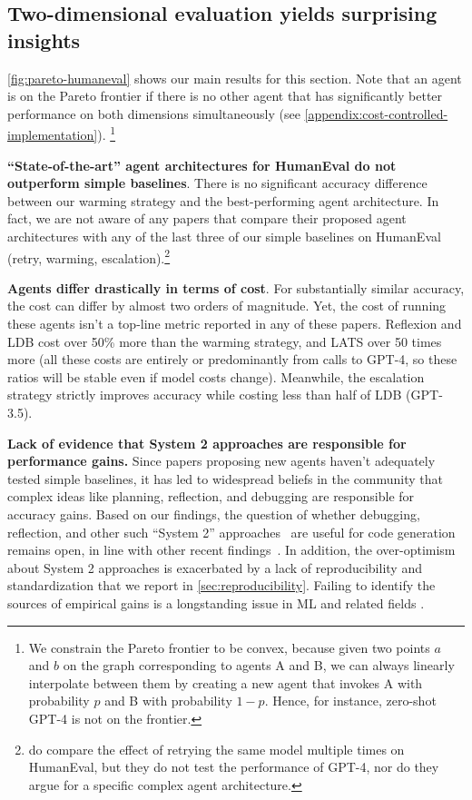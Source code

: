 \documentclass{article}
\begin{document}
\subsection{Two-dimensional evaluation yields surprising insights}

\cref{fig:pareto-humaneval} shows our main results for this section. Note that an agent is on the Pareto frontier if there is no other agent that has significantly better performance on both dimensions simultaneously (see \cref{appendix:cost-controlled-implementation}). 
\footnote{We constrain the Pareto frontier to be convex, because given two points $a$ and $b$ on the graph corresponding to agents A and B, we can always linearly interpolate between them by creating a new agent that invokes A with probability $p$ and B with probability $1-p$. Hence, for instance, zero-shot GPT-4 is not on the frontier.}


\textbf{``State-of-the-art'' agent architectures for HumanEval do not outperform simple baselines}. There is no significant accuracy difference between our warming strategy and the best-performing agent architecture. In fact, we are not aware of any papers that compare their proposed agent architectures with any of the last three of our simple baselines on HumanEval (retry, warming, escalation).\footnote{\citet{chen_are_2024} do compare the effect of retrying the same model multiple times on HumanEval, but they do not test the performance of GPT-4, nor do they argue for a specific complex agent architecture.}

\textbf{Agents differ drastically in terms of cost}. For substantially similar accuracy, the cost can differ by almost two orders of magnitude. Yet, the cost of running these agents isn't a top-line metric reported in any of these papers. Reflexion and LDB cost over 50\% more than the warming strategy, and LATS over 50 times more (all these costs are entirely or predominantly from calls to GPT-4, so these ratios will be stable even if model costs change). Meanwhile, the escalation strategy strictly improves accuracy while costing less than half of LDB (GPT-3.5).

\textbf{Lack of evidence that System 2 approaches are responsible for performance gains.} Since papers proposing new agents haven't adequately tested simple baselines, it has led to widespread beliefs in the community that complex ideas like planning, reflection, and debugging are responsible for accuracy gains. Based on our findings, the question of whether debugging, reflection, and other such ``System 2'' approaches~\citep{kambhampati_llms_2024} are useful for code generation remains open, in line with other recent findings~\citep{verma_brittle_2024, huang_large_2023}. In addition, the over-optimism about System 2 approaches is exacerbated by a lack of reproducibility and standardization that we report in \cref{sec:reproducibility}. Failing to identify the sources of empirical gains is a longstanding issue in ML and related fields \citep{lipton_troubling_2018, henderson_deep_2018}. 
\end{document}
